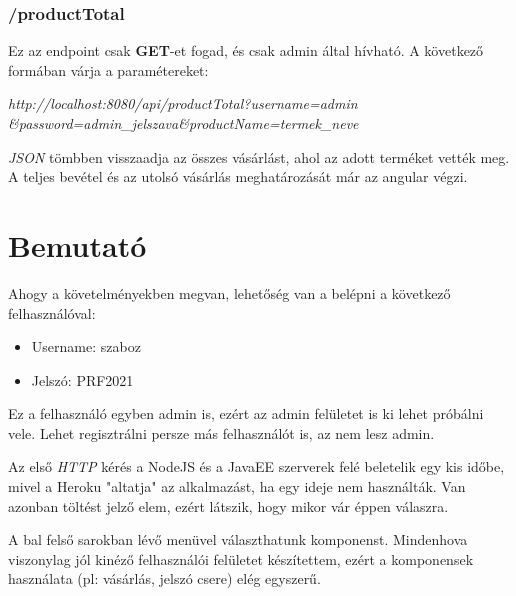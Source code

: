 \documentclass[]{article}
\begin{document}
\subsubsection{/productTotal}

Ez az endpoint csak \textbf{GET}-et fogad, és csak admin által hívható. A következő formában várja a paramétereket:

\begin{center}
	\textit{http://localhost:8080/api/productTotal?username=admin
		\newline
		\&password=admin\_jelszava\&productName=termek\_neve}
\end{center}

\textit{JSON} tömbben visszaadja az összes vásárlást, ahol az adott terméket vették meg. A teljes bevétel és az utolsó vásárlás meghatározását már az angular végzi.

\section{Bemutató}

Ahogy a követelményekben megvan, lehetőség van a belépni a következő felhasználóval:

\begin{itemize}
	\item Username: szaboz
	\item Jelszó: PRF2021
\end{itemize}

Ez a felhasználó egyben admin is, ezért az admin felületet is ki lehet próbálni vele. Lehet regisztrálni persze más felhasználót is, az nem lesz admin.

Az első \textit{HTTP} kérés a NodeJS és a JavaEE szerverek felé beletelik egy kis időbe, mivel a Heroku "altatja" az alkalmazást, ha egy ideje nem használták. Van azonban töltést jelző elem, ezért látszik, hogy mikor vár éppen válaszra.

A bal felső sarokban lévő menüvel választhatunk komponenst. Mindenhova viszonylag jól kinéző felhasználói felületet készítettem, ezért a komponensek használata (pl: vásárlás, jelszó csere) elég egyszerű.
\end{document}
